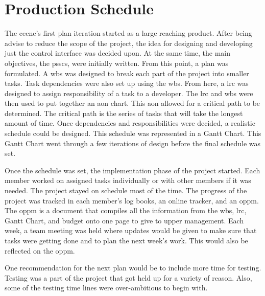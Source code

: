 \section{Production Schedule}
The \gls{ceenc}'s first plan iteration started as a large reaching product.
After being advise to reduce the scope of the project, the idea for designing and developing just the control interface was decided upon.
At the same time, the main objectives, the \gls{pssc}s, were initially written.
From this point, a plan was formulated.
A \gls{wbs} was designed to break each part of the project into smaller tasks.
Task dependencies were also set up using the \gls{wbs}. 
From here, a \gls{lrc} was designed to assign responsibility of a task to a developer.
The \gls{lrc} and \gls{wbs} were then used to put together an \gls{aon} chart.
This \gls{aon} allowed for a critical path to be determined. 
The critical path is the series of tasks that will take the longest amount of time.
Once dependencies and responsibilities were decided, a realistic schedule could be designed.
This schedule was represented in a Gantt Chart.
This Gantt Chart went through a few iterations of design before the final schedule was set.

Once the schedule was set, the implementation phase of the project started. 
Each member worked on assigned tasks individually or with other members if it was needed.
The project stayed on schedule most of the time.
The progress of the project was tracked in each member's log books, an online tracker, and an \gls{oppm}.
The \gls{oppm} is a document that compiles all the information from the \gls{wbs}, \gls{lrc}, Gantt Chart, and budget onto one page to give to upper management.
Each week, a team meeting was held where updates would be given to make sure that tasks were getting done and to plan the next week's work.
This would also be reflected on the \gls{oppm}.

One recommendation for the next plan would be to include more time for testing. 
Testing was a part of the project that got held up for a variety of reason.
Also, some of the testing time lines were over-ambitious to begin with.
